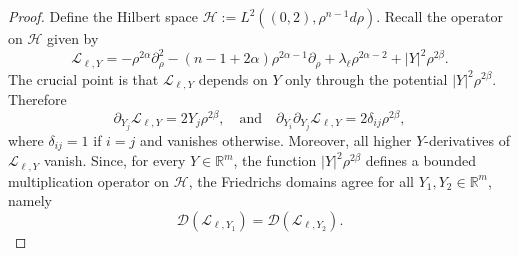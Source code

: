 \documentclass[12pt]{amsart}
\begin{document}
\begin{proof}
Define the Hilbert space $\mathcal{H}:= L^2((0,2), \rho^{n-1}d\rho)$. Recall the operator on $\mathcal{H}$ given by
\begin{equation*}
    \mathcal{L}_{\ell,Y} = - \rho^{2\alpha} \partial_\rho^2 - (n-1+2\alpha) \rho^{2\alpha-1} \partial_\rho + \lambda_\ell \rho^{2\alpha -2} + |Y|^2 \rho^{2\beta}.
\end{equation*}
The crucial point is that $\mathcal{L}_{\ell,Y}$ depends on $Y$ only through the potential $|Y|^2 \rho^{2\beta}$. Therefore
\begin{equation}
    \partial_{Y_j} \mathcal{L}_{\ell,Y} = 2Y_j \rho^{2\beta},\quad \text{and}\quad \partial_{Y_i} \partial_{Y_j} \mathcal{L}_{\ell,Y} = 2 \delta_{ij} \rho^{2\beta},
\end{equation}
where $\delta_{ij} = 1$ if $i=j$ and vanishes otherwise. Moreover, all higher $Y$-derivatives of $\mathcal{L}_{\ell,Y}$ vanish. Since, for every $Y\in \mathbb{R}^m$, the function $|Y|^2 \rho^{2\beta}$ defines a bounded multiplication operator on $\mathcal{H}$, the Friedrichs domains agree for all $Y_1, Y_2 \in \mathbb{R}^m$, namely
\begin{equation*}
    \mathcal{D}(\mathcal{L}_{\ell, Y_1}) = \mathcal{D}(\mathcal{L}_{\ell, Y_2}).
\end{equation*}


\end{proof}
\end{document}
